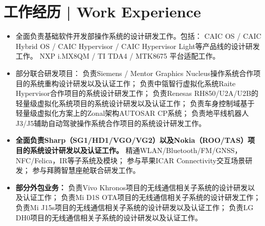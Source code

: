 \documentclass{resume}
\begin{document}
\section{工作经历 | Work Experience}
\begin{itemize}
  \item 全面负责基础软件开发部操作系统的设计研发工作。包括：\newline
 CAIC OS / CAIC Hybrid OS / CAIC Hypervisor / CAIC Hypervisor Light等产品线的设计研发工作。\newline
 NXP i.MX8QM / TI TDA4 / MTK8675 平台适配工作。
  \item 部分联合研发项目：\newline
  负责Siemens / Mentor Graphics Nucleus操作系统合作项目的系统重构设计研发以及认证工作；\newline
  负责中瓴智行虚拟化系统Raite Hypervisor合作项目的系统设计研发工作；\newline
  负责Renesas RH850/U2A/U2B的轻量级虚拟化系统项目的系统设计研发以及认证工作；\newline
  负责车身控制域基于轻量级虚拟化方案上的Zonal架构AUTOSAR CP系统；\newline
  负责地平线机器人J3/J5辅助自动驾驶操作系统合作项目的系统设计研发工作。 
\end{itemize}
\spaceline{}

\begin{itemize}
  \item \textbf{全面负责Sharp（SG1/HD1/VGO/VG2）以及Nokia（ROO/TAS）项目的系统设计研发以及认证工作。}\newline
精通WLAN/Bluetooth/FM/GNSS，NFC/Felica，IR等子系统及模块；\newline
参与苹果ICAR Connectivity交互场景研发；\newline
参与拜腾智慧座舱联合研发工作。
  \item \textbf{部分外包业务：}\newline
负责Vivo Khronos项目的无线通信相关子系统的设计研发以及认证工作；\newline
负责Mi D1S OTA项目的无线通信相关子系统的设计研发工作；\newline
负责Mi J15s项目的无线通信相关子系统的设计研发以及认证工作；\newline
负责LG DH0项目的无线通信相关子系统的设计研发以及认证工作。
\end{itemize}
\spaceline{}
\end{document}
